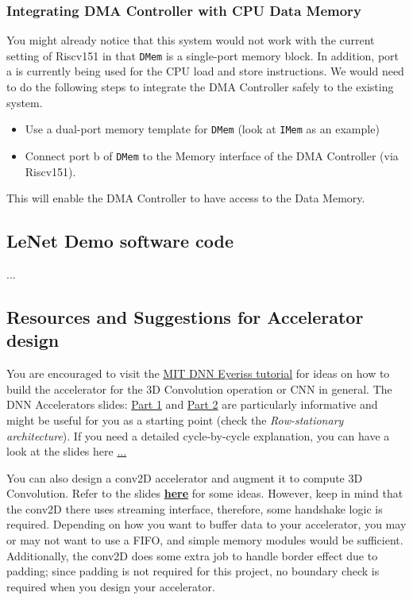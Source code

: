 \documentclass[11pt]{article}
\begin{document}
\subsubsection{Integrating DMA Controller with CPU Data Memory}

You might already notice that this system would not work with the current setting of Riscv151 in that \texttt{DMem} is a single-port memory block. In addition, port a is currently being used for the CPU load and store instructions. We would need to do the following steps to integrate the DMA Controller safely to the existing system.

\begin{itemize}
\item Use a dual-port memory template for \texttt{DMem} (look at \texttt{IMem} as an example)
\item Connect port b of \texttt{DMem} to the Memory interface of the DMA Controller (via Riscv151).
\end{itemize}

This will enable the DMA Controller to have access to the Data Memory.
\subsection{LeNet Demo software code}

...

\subsection{Resources and Suggestions for Accelerator design}

You are encouraged to visit the \href{http://eyeriss.mit.edu/tutorial.html}{MIT DNN Eyeriss tutorial} for ideas on how to build the accelerator for the 3D Convolution operation or CNN in general. The DNN Accelerators slides: \href{http://www.rle.mit.edu/eems/wp-content/uploads/2019/06/Tutorial-on-DNN-05-DNN-Accelerator-Architectures.pdf}{Part 1} and \href{http://www.rle.mit.edu/eems/wp-content/uploads/2019/06/Tutorial-on-DNN-06-RS-Dataflow-and-NoC.pdf}{Part 2} are particularly informative and might be useful for you as a starting point (check the \textit{Row-stationary architecture}). If you need a detailed cycle-by-cycle explanation, you can have a look at the slides here \href{}{...}

You can also design a conv2D accelerator and augment it to compute 3D Convolution. Refer to the slides \href{https://drive.google.com/file/d/1QGFzt3gZ53IK1ZCIaJ57NUKucU77Nwd-}{\textbf{here}} for some ideas. However, keep in mind that the conv2D there uses streaming interface, therefore, some handshake logic is required. Depending on how you want to buffer data to your accelerator, you may or may not want to use a FIFO, and simple memory modules would be sufficient. Additionally, the conv2D does some extra job to handle border effect due to padding; since padding is not required for this project, no boundary check is required when you design your accelerator.
\end{document}
